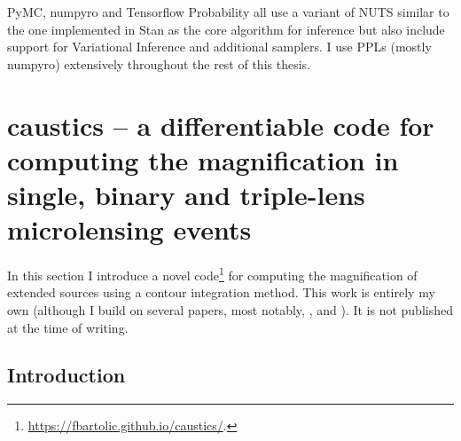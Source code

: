 \documentclass[12pt,dvipsnames]{report}
\newcommand{\ssf}[1]{\textsf{#1}}
\begin{document}
\ssf{PyMC}, \ssf{numpyro}
and \ssf{Tensorflow Probability} all use a variant of NUTS similar to the one 
implemented in \ssf{Stan} as the core algorithm for inference but also 
include support for Variational Inference and additional samplers. 
I use PPLs (mostly \ssf{numpyro}) extensively throughout the rest of this thesis.

\chapter{\ssf{caustics} -- a differentiable code for computing the
  magnification in single, binary and triple-lens microlensing events}
\label{ch:caustics}

In this section I introduce a novel 
code\footnote{\url{https://fbartolic.github.io/caustics/}.} 
for computing the magnification of extended 
sources using a contour integration method. This work is entirely my own (although I build on 
several papers, most notably, \citet{2021MNRAS.503.6143K}, \citet{1998A&A...333L..79D} and 
\citet{2018MNRAS.479.5157B}). It is not published at the time of writing.

\section{Introduction}
\end{document}

